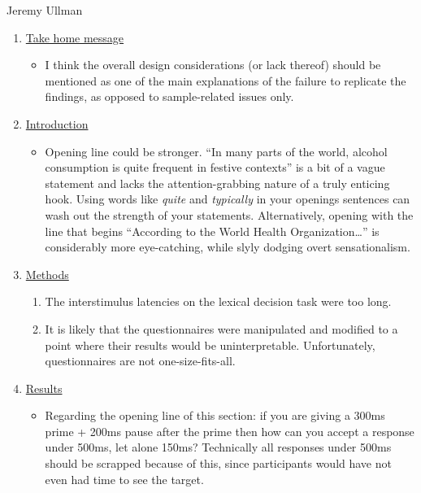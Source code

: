 \documentclass[authordate, serif, review]{jote-article}
\begin{document}
\begin{multicols}{2}
\begin{reviewend}{ Jeremy Ullman}
\begin{enumerate}[label=\textbf{\arabic*}), start=0]
        \item \hyperref[sec:take-home]{Take home message}
            \begin{itemize}
                \item I think the overall design considerations (or lack thereof) should be mentioned as one of the main explanations of the failure to replicate the findings, as opposed to sample-related issues only.
            \end{itemize}
            
        \item \hyperref[sec:introduction]{Introduction}
            \begin{itemize}
                \item Opening line could be stronger. ``In many parts of the world, alcohol consumption is quite frequent in festive contexts'' is a bit of a vague statement and lacks the attention-grabbing nature of a truly enticing hook. Using words like \textit{quite }and\textit{ typically} in your openings sentences can wash out the strength of your statements. Alternatively, opening with the line that begins ``According to the World Health Organization{\dots}'' is considerably more eye-catching, while slyly dodging overt sensationalism.
            \end{itemize}
            
        \item \hyperref[sec:methods]{Methods}
            \begin{enumerate}
                \item The interstimulus latencies on the lexical decision task were too long. 
                \item It is likely that the questionnaires were manipulated and modified to a point where their results would be uninterpretable. Unfortunately, questionnaires are not one-size-fits-all.
            \end{enumerate}
            
        \item \hyperref[sec:results]{Results}
            \begin{itemize}
                \item Regarding the opening line of this section: if you are giving a 300ms prime + 200ms pause after the prime then how can you accept a response under 500ms, let alone 150ms? Technically all responses under 500ms should be scrapped because of this, since participants would have not even had time to see the target.
            \end{itemize}
    \end{enumerate}
\end{reviewend}

\newpage
\end{multicols}
{}
{}
\end{document}
